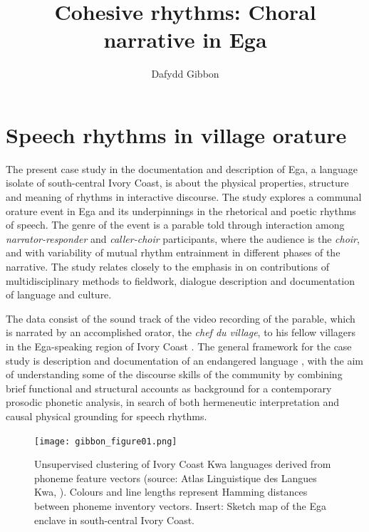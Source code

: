 \documentclass[output=paper,colorlinks,citecolor=brown]{langscibook}
\author{Dafydd Gibbon\orcid{0000-0002-9825-5516}\affiliation{Bielefeld University}}
\title{Cohesive rhythms: Choral narrative in Ega}
\begin{document}
\maketitle


\section{Speech rhythms in village orature}

The present case study in the documentation and description of Ega, a language isolate of south-central Ivory Coast, is about the physical properties, structure and meaning of rhythms in interactive discourse. The study explores a communal orature event in Ega and its underpinnings in the rhetorical and poetic rhythms of speech. The genre of the event is a parable told through interaction among \textit{narrator-responder} and \textit{caller-choir} participants, where the audience is the \textit{choir}, and with variability of mutual rhythm entrainment in different phases of the narrative. The study relates closely to the emphasis in  on contributions of multidisciplinary methods to fieldwork, dialogue description and documentation of language and culture.

The data consist of the sound track of the video recording of the parable, which is narrated by an accomplished orator, the \textit{chef du village}, to his fellow villagers in the Ega-speaking region of Ivory Coast \citep{rossinigibbon2011}. The general framework for the case study is description and documentation of an endangered language \citep{gibbonbowbirdhughes2004}, with the aim of understanding some of the discourse skills of the community by combining brief functional and structural accounts as background for a contemporary prosodic phonetic analysis, in search of both hermeneutic interpretation and causal physical grounding for speech rhythms.

\begin{figure}
\texttt{[image: gibbon\_figure01.png]}
\caption{\label{fig:fig01}Unsupervised clustering of Ivory Coast Kwa languages derived from phoneme feature vectors (source: Atlas Linguistique des Langues Kwa, \citealt{herault1983}). Colours and line lengths represent Hamming distances between phoneme inventory vectors. Insert: Sketch map of the Ega enclave in south-central Ivory Coast.}
\end{figure}
\end{document}
